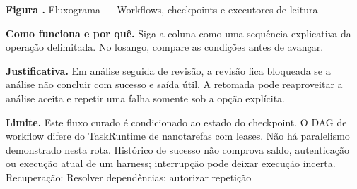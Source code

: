 {\small\textbf{Figura \thefigure.} Fluxograma --- Workflows, checkpoints e executores de leitura}\par\smallskip
\noindent\textbf{Como funciona e por quê.} Siga a coluna como uma sequência explicativa da operação delimitada. No losango, compare as condições antes de avançar.\par
\noindent\textbf{Justificativa.} Em análise seguida de revisão, a revisão fica bloqueada se a análise não concluir com sucesso e saída útil. A retomada pode reaproveitar a análise aceita e repetir uma falha somente sob a opção explícita.\par
\noindent\textbf{Limite.} Este fluxo curado é condicionado ao estado do checkpoint. O DAG de workflow difere do TaskRuntime de nanotarefas com leases. Não há paralelismo demonstrado nesta rota. Histórico de sucesso não comprova saldo, autenticação ou execução atual de um harness; interrupção pode deixar execução incerta. Recuperação: Resolver dependências; autorizar repetição\par\smallskip
{}
